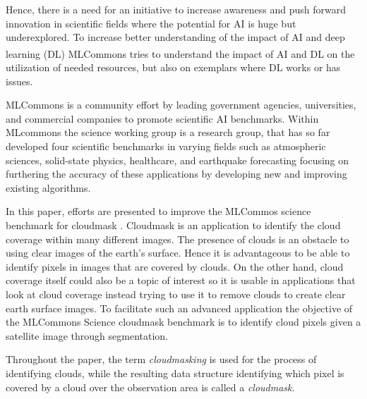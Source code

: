 \documentclass[sigplan,screen]{acmart}
\begin{document}
Hence, there is a need for an initiative to increase awareness and push forward innovation in scientific fields where the potential for AI is huge but underexplored. To increase better understanding of the impact of AI and deep learning (DL) 
MLCommons\textsuperscript{\texttrademark} \cite{www-mlcommons} tries to understand the impact of AI and DL   
on the utilization of needed resources, but also on exemplars where DL works or has issues.

MLCommons is a community effort by leading government agencies, universities, and commercial companies to promote scientific AI benchmarks. Within MLcommons the science working group \cite{Thiyagalingam2022AIBF} is a research group, that has so far developed four scientific benchmarks in varying fields such as atmospheric sciences, solid-state physics, healthcare, and earthquake forecasting \cite{las23-insights-mlcommons-education} focusing on furthering the accuracy of these applications by developing new and improving existing algorithms. 


In this paper, efforts are presented to improve the MLCommos science benchmark for cloudmask \cite{Thiyagalingam2022AIBF}. Cloudmask is an application to identify the cloud coverage within many different images. The presence of clouds is an obstacle to using clear images of the earth's surface. Hence it is advantageous to be able to identify pixels in images that are covered by clouds. On the other hand, cloud coverage itself could also be a topic of interest so it is usable in applications that look at cloud coverage instead trying to use it to remove clouds to create clear earth surface images. 
To facilitate such an advanced application the objective of the MLCommons Science cloudmask benchmark is to identify cloud pixels given a satellite image through segmentation. 

Throughout the paper, the term {\em cloudmasking} is used for the process of identifying clouds, while the resulting data structure identifying which pixel is covered by a cloud over the observation area is called a {\em cloudmask}.

\end{document}
